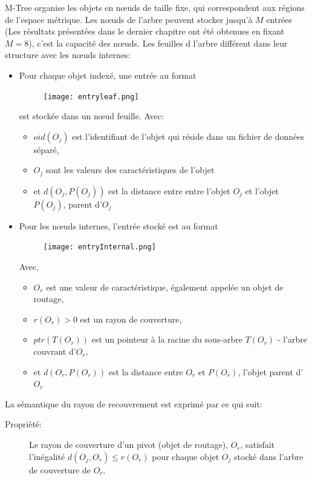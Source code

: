 M-Tree organise les objets en nœuds de taille fixe, qui correspondent aux régions de l'espace métrique. Les nœuds de l'arbre peuvent stocker jusqu'à \textbf{$ M $} entrées (Les résultats présentées dans le dernier chapitre ont été obtenues en fixant $ M = 8 $), c'est la capacité des nœuds. Les feuilles d l’arbre différent dans leur structure avec les nœuds internes:
\begin{itemize}
	\item Pour chaque objet indexé, une entrée au format 
	\begin{figure}[H]
		\centering
		\texttt{[image: entryleaf.png]} %
	\end{figure} 
	est stockée dans un nœud feuille. Avec:
	\begin{itemize}
		\item \textbf{$ oid(O_j) $} est l'identifiant de l'objet qui réside dans un fichier de données séparé,
		\item \textbf{$ O_j $} sont les valeurs des caractéristiques de l'objet 
		\item et \textbf{$ d(O_j, P(O_j)) $} est la distance entre entre l’objet \textbf{$ O_j $} et l’objet  \textbf{$ P(O_j) $}, parent d'\textbf{$ O_j $}
	\end{itemize}

	\item Pour les nœuds internes, l'entrée stocké est au format
	\begin{figure}[H]
		\centering
		\texttt{[image: entryInternal.png]} %
	\end{figure} 
	Avec,
	\begin{itemize}
		\item \textbf{$ O_r $} est une valeur de caractéristique, également appelée un objet de routage,
		\item \textbf{$ r(O_r) $}$>0$ est un rayon de couverture, 
		\item \textbf{$ ptr(T( O_r)) $} est un pointeur à la racine du sous-arbre \textbf{$ T(O_r) $} - l'arbre couvrant d'\textbf{$ O_r $}, 
		\item et \textbf{$ d(O_r, P(O_r)) $} est la distance entre \textbf{$ O_r $} et \textbf{$ P(O_r) $}, l'objet parent d'\textbf{$ O_r $}\\
		
	\end{itemize}
\end{itemize}


La sémantique du rayon de recouvrement est exprimé par ce qui suit:
\begin{description}
	\item[Proprièté:] Le rayon de couverture d'un pivot (objet de routage), $ O_r $, satisfait l'inégalité $ d(O_j, O_r) \le r(O_r) $ pour chaque objet $ O_j $ stocké dans l'arbre de couverture de $ O_r $.
\end{description}

